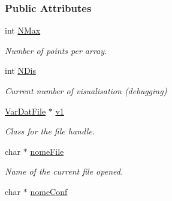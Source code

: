 \subsubsection*{\-Public \-Attributes}
\begin{DoxyCompactItemize}
\item 
\hypertarget{classElementiGrafici_a35e5db5990993f09236122f4dfaf7bc3}{int \hyperlink{classElementiGrafici_a35e5db5990993f09236122f4dfaf7bc3}{\-N\-Max}}\label{classElementiGrafici_a35e5db5990993f09236122f4dfaf7bc3}

\begin{DoxyCompactList}\small\item\em \-Number of points per array. \end{DoxyCompactList}\item 
\hypertarget{classElementiGrafici_a4e1e3a7469a7fc5af310a17c2c2c787a}{int \hyperlink{classElementiGrafici_a4e1e3a7469a7fc5af310a17c2c2c787a}{\-N\-Dis}}\label{classElementiGrafici_a4e1e3a7469a7fc5af310a17c2c2c787a}

\begin{DoxyCompactList}\small\item\em \-Current number of visualisation (debugging) \end{DoxyCompactList}\item 
\hypertarget{classElementiGrafici_af8d0da3e35bb5e28aba9329efffbfb95}{\hyperlink{classVarDatFile}{\-Var\-Dat\-File} $\ast$ \hyperlink{classElementiGrafici_af8d0da3e35bb5e28aba9329efffbfb95}{v1}}\label{classElementiGrafici_af8d0da3e35bb5e28aba9329efffbfb95}

\begin{DoxyCompactList}\small\item\em \-Class for the file handle. \end{DoxyCompactList}\item 
\hypertarget{classElementiGrafici_ae062c77de5b1cd6767e9b53846eb76fe}{char $\ast$ \hyperlink{classElementiGrafici_ae062c77de5b1cd6767e9b53846eb76fe}{nome\-File}}\label{classElementiGrafici_ae062c77de5b1cd6767e9b53846eb76fe}

\begin{DoxyCompactList}\small\item\em \-Name of the current file opened. \end{DoxyCompactList}\item 
\hypertarget{classElementiGrafici_a8bf6d3f7358b88169b52d2b2f03a94f6}{char $\ast$ \hyperlink{classElementiGrafici_a8bf6d3f7358b88169b52d2b2f03a94f6}{nome\-Conf}}\label{classElementiGrafici_a8bf6d3f7358b88169b52d2b2f03a94f6}


\end{DoxyCompactItemize}

